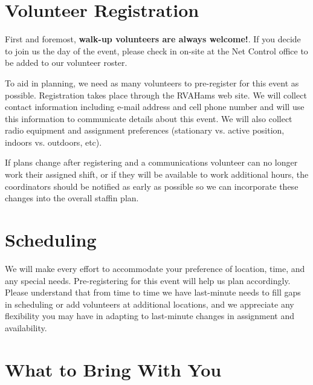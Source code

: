 \documentclass[pdflatex,letterpaper,twoside,12pt]{book}
\begin{document}

\section{Volunteer Registration}

First and foremost, \textbf{walk-up volunteers are always welcome!}.  If you decide to join us the day of the event, please check in on-site at the Net Control office to be added to our volunteer roster.

To aid in planning, we need as many volunteers to pre-register for this event as possible.  Registration takes place through the RVAHams web site.  We will collect contact information including e-mail address and cell phone number and will use this information to communicate details about this event.  We will also collect radio equipment and assignment preferences (stationary vs. active position, indoors vs. outdoors, etc).

If plans change after registering and a communications volunteer can no longer work their assigned shift, or if they will be available to work additional hours, the coordinators should be notified as early as possible so we can incorporate these changes into the overall staffin plan.


\section{Scheduling}

We will make every effort to accommodate your preference of location, time, and any special needs.  Pre-registering for this event will help us plan accordingly.  Please understand that from time to time we have last-minute needs to fill gaps in scheduling or add volunteers at additional locations, and we appreciate any flexibility you may have in adapting to last-minute changes in assignment and availability.


\section{What to Bring With You}
\end{document}

